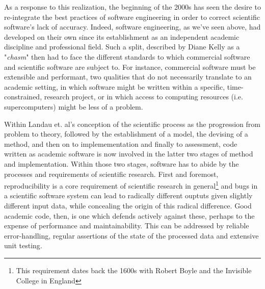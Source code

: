 As a response to this realization, the beginning of the 2000s has seen the desire to re-integrate the best practices of software engineering in order to correct scientific software's lack of accuracy\cite{hatton_how_1994}. Indeed, software engineering, as we've seen above, had developed on their own since its establishment as an independent academic discipline and professional field. Such a split, described by Diane Kelly as a "\emph{chasm}"\cite{kelly_software_2007} then had to face the different standards to which commercial software and scientific software are subject to. For instance, commercial software must be extensible and performant, two qualities that do not necessarily translate to an academic setting, in which software might be written within a specific, time-constrained, research project, or in which access to computing resources (i.e. supercomputers) might be less of a problem.

Within Landau et. al's conception of the scientific process as the progression from problem to theory, followed by the establishment of a model, the devising of a method, and then on to implemementation and finally to assessment\cite{landau_survey_2011}, code written as academic software is now involved in the latter two stages of  method and implementation. Within those two stages, software has to abide by the processes and requirements of scientific research. First and foremost, reproducibility is a core requirement of scientific research in general\footnote{This requirement dates back the 1600s with Robert Boyle and the Invisible College in England\cite{leveque_reproducible_2012}} and bugs in a scientific software system can lead to radically different ouptuts given slightly different input data, while concealing the origin of this radical difference. Good academic code, then, is one which defends actively against these, perhaps to the expense of performance and maintainability. This can be addressed by reliable error-handling, regular assertions of the state of the processed data and extensive unit testing\cite{wilson_best_2014}.

